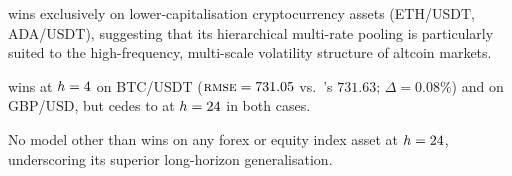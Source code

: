 \begin{table}[htbp]
\begin{threeparttable}
\begin{tabular}{l l l l}
    \bottomrule
  \end{tabular}
  \begin{tablenotes}[flushleft]\footnotesize
    \item \nhits wins exclusively on lower-capitalisation cryptocurrency
      assets (ETH/USDT, ADA/USDT), suggesting that its hierarchical
      multi-rate pooling is particularly suited to the high-frequency,
      multi-scale volatility structure of altcoin markets.
    \item \patchtst wins at $h=4$ on BTC/USDT ($\textsc{rmse} = 731.05$
      vs.\ \moderntcn's $731.63$; $\Delta = 0.08\%$) and on
      GBP/USD, but cedes to \moderntcn at $h=24$ in both cases.
    \item No model other than \moderntcn wins on any forex or equity index
      asset at $h=24$, underscoring its superior long-horizon
      generalisation.
  \end{tablenotes}
  \end{threeparttable}
\end{table}
